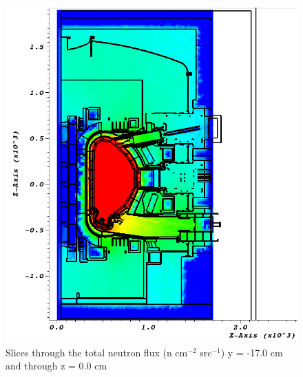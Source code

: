 \documentclass[12pt]{article}
\begin{document}
\begin{figure}[ht!]
  \includegraphics[scale=0.35]{../plots/neutron/nob4c/y_-17.png}
  \caption{Slices through the total neutron flux (n cm$^{-2}$ src$^{-1}$)
  y = -17.0 cm and through z = 0.0 cm}
  \label{fig:wwinp}
\end{figure}
\end{document}
